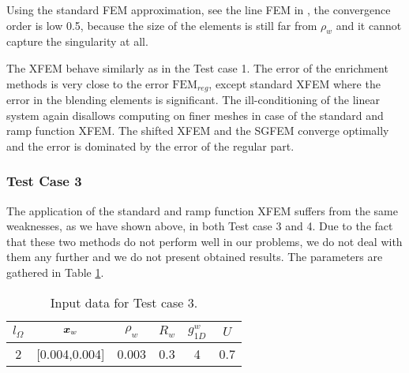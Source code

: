 Using the standard FEM approximation, see the line FEM in , the convergence order is low 0.5,
because the size of the elements is still far from $\rho_w$ and it cannot capture the singularity at all.

The XFEM behave similarly as in the Test case 1. The error of the enrichment methods is very close to the error $\textrm{FEM}_{reg}$,
except standard XFEM where the error in the blending elements is significant. The ill-conditioning of the linear system again 
disallows computing on finer meshes in case of the standard and ramp function XFEM.
The shifted XFEM and the SGFEM converge optimally and the error is dominated by the error of the regular part.


\subsubsection{Test Case 3}
The application of the standard and ramp function XFEM suffers from the same weaknesses, as we have shown above, in both Test case 3 and 4.
Due to the fact that these two methods do not perform well in our problems, we do not deal with them any further
and we do not present obtained results.
The parameters are gathered in Table \ref{tab:test_case_3_data}.
%
\begin{table}[!htb]
\begin{center}
\begin{tabular}{cccccc}
\toprule
$l_\Omega$ & $\mathbf{\boldsymbol{x}}_w$  & $\rho_w$ & $R_w$ & $g^w_{1D}$ & $U$ \\
\midrule
2 & [0.004,0.004] & 0.003 & 0.3 & 4 & 0.7\\
\bottomrule
\end{tabular}
\caption{Input data for Test case 3.}
\label{tab:test_case_3_data}
\end{center}
\end{table}
%

